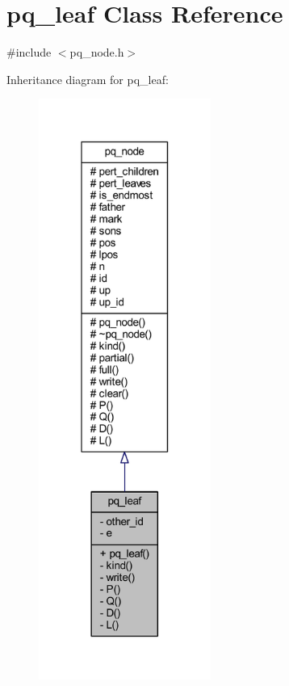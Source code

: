 \hypertarget{classpq__leaf}{}\section{pq\+\_\+leaf Class Reference}
\label{classpq__leaf}


{\ttfamily \#include $<$pq\+\_\+node.\+h$>$}



Inheritance diagram for pq\+\_\+leaf\+:\nopagebreak
\begin{figure}[H]
\begin{center}
\leavevmode
\includegraphics[width=160pt]{classpq__leaf__inherit__graph}
\end{center}
\end{figure}


